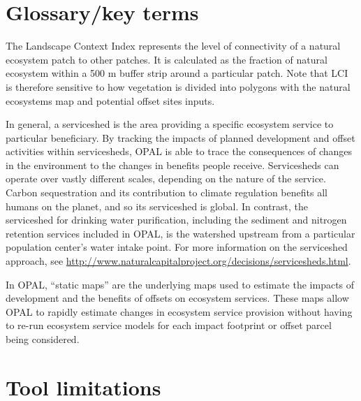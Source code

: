 \documentclass[11pt,letterpaper]{report}
\begin{document}
\chapter{Glossary/key terms}
\label{ch:glossary}

	\begin{description}[leftmargin=!,labelindent=!,itemindent=-0.15in]
		
		\item[Landscape Context Index (LCI):] The Landscape Context Index represents the level of connectivity of a natural ecosystem patch to other patches. It is calculated as the fraction of natural ecosystem within a 500 m buffer strip around a particular patch. Note that LCI is therefore sensitive to how vegetation is divided into polygons with the natural ecosystems map and potential offset sites inputs.
		
		\item[Serviceshed:] In general, a serviceshed is the area providing a specific ecosystem service to particular beneficiary. By tracking the impacts of planned development and offset activities within servicesheds, OPAL is able to trace the consequences of changes in the environment to the changes in benefits people receive. Servicesheds can operate over vastly different scales, depending on the nature of the service. Carbon sequestration and its contribution to climate regulation benefits all humans on the planet, and so its serviceshed is global. In contrast, the serviceshed for drinking water purification, including the sediment and nitrogen retention services included in OPAL, is the watershed upstream from a particular population center's water intake point. For more information on the serviceshed approach, see \url{http://www.naturalcapitalproject.org/decisions/servicesheds.html}.
		
		\item[Static map:] In OPAL, ``static maps'' are the underlying maps used to estimate the impacts of development and the benefits of offsets on ecosystem services. These maps allow OPAL to rapidly estimate changes in ecosystem service provision without having to re-run ecosystem service models for each impact footprint or offset parcel being considered.
	\end{description}	

\chapter{Tool limitations}
\label{ch:limits}
\end{document}
